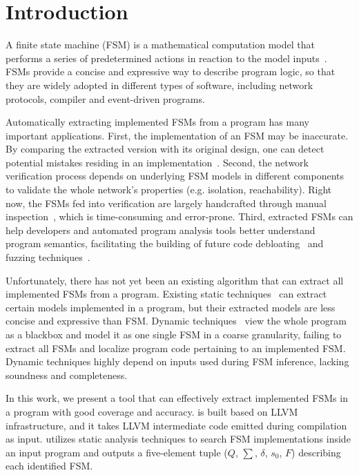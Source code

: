 \section{Introduction}
\label{sec:intro}

A finite state machine (FSM) is a mathematical computation model 
that performs a series of predetermined actions in 
reaction to the model inputs~\cite{fsm}. 
FSMs provide a concise and expressive way to describe
program logic, so that they are widely adopted in different types of software, 
including network protocols, 
compiler and event-driven programs. 

Automatically extracting implemented FSMs from a program has 
many important applications. 
First, the implementation of an FSM may be inaccurate. By 
comparing the extracted version with its original design, one 
can detect potential mistakes residing in an implementation~\cite{protocol-bug}. 
Second, the network verification process depends on underlying FSM models 
in different components to validate the whole network's properties 
(e.g. isolation, reachability).
Right now, the FSMs fed into verification are largely handcrafted through 
manual inspection~\cite{fayaz2016buzz,SymNet}, 
which is time-consuming and error-prone. 
Third, extracted FSMs can help developers and automated program analysis tools
better understand program semantics, facilitating the building of future 
code debloating~\cite{container-debloating-1,container-debloating-2,dinghao-1} 
and fuzzing techniques~\cite{afl,Angora,youwei-1}.



Unfortunately, there has not yet been an existing algorithm that can extract 
all implemented FSMs from a program.
Existing static techniques~\cite{wu2016automatic,khalid2016paving} 
can extract certain models implemented in a program,
but their extracted models are less concise and expressive than FSM. 
Dynamic techniques~\cite{angluin1987learning,moon2019alembic,cho2011mace} 
view the whole program as a blackbox and 
model it as one single FSM in a coarse granularity, 
failing to extract all FSMs and localize program code 
pertaining to an implemented FSM. 
Dynamic techniques highly depend on inputs used during FSM inference, 
lacking soundness and completeness.  


In this work, we present a tool \Tool{} that can effectively extract implemented FSMs 
in a program
with good coverage and accuracy. 
\Tool{} is built based on LLVM infrastructure, 
and it takes LLVM intermediate 
code emitted during compilation as input. 
\Tool{} utilizes static analysis techniques to search FSM implementations inside 
an input program
and outputs a five-element tuple ($Q$, $\sum$, $\delta$, $s_0$, $F$) 
describing each identified FSM. 


